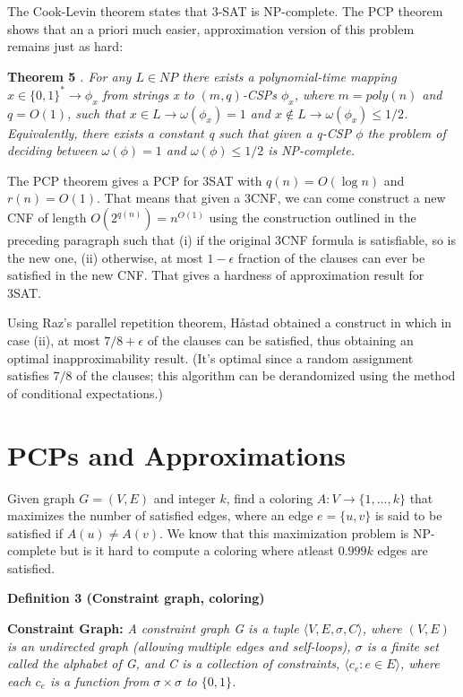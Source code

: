 The Cook-Levin theorem states that 3-SAT is NP-complete. The PCP theorem shows that an a priori much easier, approximation version of this problem remains just as hard:

\textbf{Theorem 5} \textit{. For any $L \in NP$ there exists a polynomial-time mapping $x \in \{0, 1\}^*\rightarrow \phi_x$ from strings x to $(m, q)$-CSPs $\phi_x$, where $m = poly(n)$ and $q = O(1)$, such that $x \in L \rightarrow \omega(\phi_x) = 1$ and $x \notin L \rightarrow \omega(\phi_x) \leq 1/2$. Equivalently, there exists a constant
q such that given a q-CSP $\phi$ the problem of deciding between $\omega(\phi) = 1$ and $\omega(\phi) \leq 1/2$ is NP-complete.}

The PCP theorem gives a PCP for 3SAT with $q(n) = O(\log n)$ and $r(n) = O(1)$. That means that given a 3CNF, we can come construct a new CNF of length $O(2^{q(n)}) = n^{O(1)}$ using the construction outlined in the preceding paragraph such that (i) if the original 3CNF formula is satisfiable, so is the new one, (ii) otherwise, at most $1-\epsilon$ fraction of the clauses can ever be satisfied in the new CNF. That gives a hardness of approximation result for 3SAT. 

Using Raz's parallel repetition theorem, Håstad obtained a construct in which in case (ii), at most $7/8+\epsilon$ of the clauses can be satisfied, thus obtaining an optimal inapproximability result. (It's optimal since a random assignment satisfies $7/8$ of the clauses; this algorithm can be derandomized using the method of conditional expectations.)


\section{PCPs and Approximations}
Given graph $G = (V,E)$ and integer $k$, find a coloring $A : V \rightarrow \{1,...,k\}$ that maximizes the number of satisfied edges, where an edge $e = \{u,v\}$ is said to be satisfied if $A(u) \neq A(v)$. We know that this maximization problem is NP-complete but is it hard to compute a coloring where atleast $0.999k$ edges are satisfied.

\textbf{Definition 3 (Constraint graph, coloring)}

\textbf{Constraint Graph:} \textit{A constraint graph G is a tuple $\langle V, E, \sigma, C \rangle$, where $(V,E)$ is an undirected graph (allowing multiple edges and self-loops), $\sigma$ is a finite set called the alphabet of G, and C is a collection of constraints, $\langle c_e : e \in E \rangle$, where each $c_e$ is a function from $\sigma \times \sigma$ to $\{0,1\}$.}

